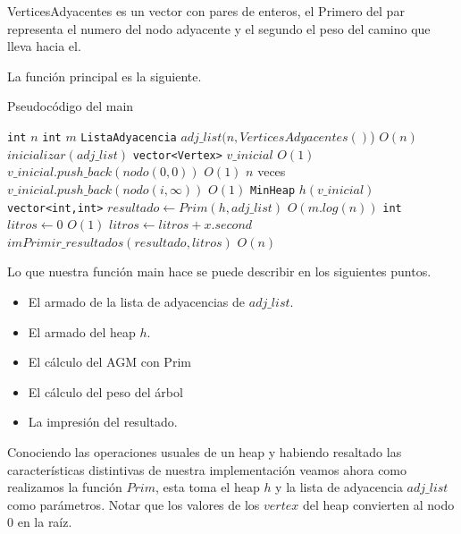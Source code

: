 VerticesAdyacentes es un vector con pares de enteros, el Primero del par representa el numero del nodo adyacente y el segundo el peso del camino que lleva hacia el.

La función principal es la siguiente.

\begin{algorithm}[H]
  \begin{algorithmic}[1]
  \caption{Pseudocódigo del main}
  \label{algo:2-1}
    	\State \texttt{int} $n$
    	\State \texttt{int} $m$
    	\State \texttt{ListaAdyacencia} $adj\_list(n, VerticesAdyacentes()$)
    	\Comment $O(n)$
	\State $inicializar(adj\_list)$
    	\normalsize
    	\State \texttt{vector<Vertex>} $ v\_inicial$
    	\Comment $O(1)$
    	\State $v\_inicial.push\_back( nodo(0,0) ) $
    	\Comment $O(1)$
    	\Comment $n$ veces
    		\State $v\_inicial.push\_back( nodo(i,\infty) ) $
    		\Comment $O(1)$
    	\EndFor
    	\State \texttt{MinHeap} $h(v\_inicial)$
    	\State \texttt{vector<int,int>} $resultado \gets Prim(h,adj\_list)$
    	\Comment $O(m.log(n))$
    	\State \texttt{int} $litros \gets 0$
    	\Comment $O(1)$
    		\State $litros \gets litros + x.second$
    	\EndFor
	\State $imPrimir\_resultados(resultado, litros)$
	\Comment $ O(n) $
		\EndProcedure
  \end{algorithmic}
  \end{algorithm}

Lo que nuestra función main hace se puede describir en los siguientes puntos.

\begin{itemize}
	\item El armado de la lista de adyacencias de $adj\_list$.
	\item El armado del heap $h$.
	\item El cálculo del AGM con Prim
	\item El cálculo del peso del árbol	
	\item La impresión del resultado.
\end{itemize}

Conociendo las operaciones usuales de un heap y habiendo resaltado las características distintivas de nuestra implementación veamos ahora como realizamos la función $Prim$, esta toma el heap $h$ y la lista de adyacencia $adj\_list$ como parámetros. Notar que los valores de los $vertex$ del heap convierten al nodo 0 en la raíz.

